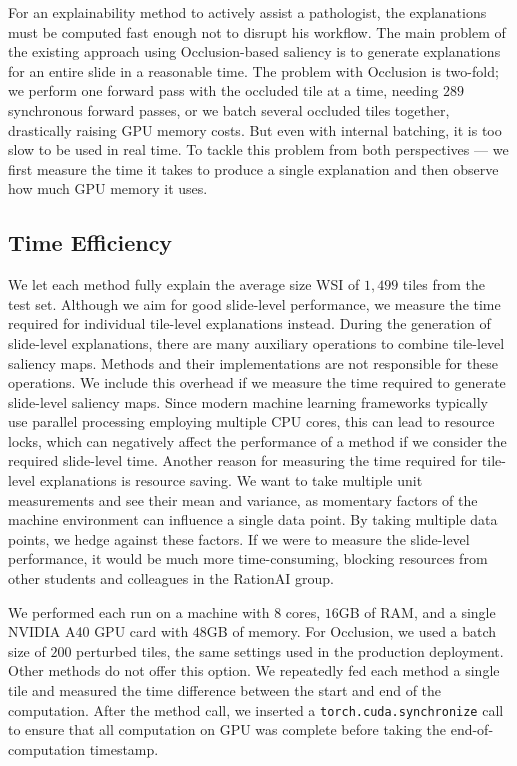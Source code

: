 For an explainability method to actively assist a pathologist, the explanations must be computed fast enough not to disrupt his workflow.
The main problem of the existing approach using Occlusion-based saliency is to generate explanations for an entire slide in a reasonable time.
The problem with Occlusion is two-fold; we perform one forward pass with the occluded tile at a time, needing $289$ synchronous forward passes, or we batch several occluded tiles together, drastically raising GPU memory costs.
But even with internal batching, it is too slow to be used in real time.
To tackle this problem from both perspectives --- we first measure the time it takes to produce a single explanation and then observe how much GPU memory it uses.

\subsection*{Time Efficiency}

 We let each method fully explain the average size WSI of $1,499$ tiles from the test set.
 Although we aim for good slide-level performance, we measure the time required for individual tile-level explanations instead.
 During the generation of slide-level explanations, there are many auxiliary operations to combine tile-level saliency maps.
 Methods and their implementations are not responsible for these operations.
 We include this overhead if we measure the time required to generate slide-level saliency maps.
 Since modern machine learning frameworks typically use parallel processing employing multiple CPU cores, this can lead to resource locks, which can negatively affect the performance of a method if we consider the required slide-level time.
 Another reason for measuring the time required for tile-level explanations is resource saving.
 We want to take multiple unit measurements and see their mean and variance, as momentary factors of the machine environment can influence a single data point. 
 By taking multiple data points, we hedge against these factors.
 If we were to measure the slide-level performance, it would be much more time-consuming, blocking resources from other students and colleagues in the RationAI group.

 We performed each run on a machine with $8$ cores, $16$GB of RAM, and a single NVIDIA A40 GPU card with $48$GB of memory.
 For Occlusion, we used a batch size of $200$ perturbed tiles, the same settings used in the production deployment.
 Other methods do not offer this option.
 We repeatedly fed each method a single tile and measured the time difference between the start and end of the computation.
 After the method call, we inserted a \texttt{torch.cuda.synchronize} call to ensure that all computation on GPU was complete before taking the end-of-computation timestamp.

